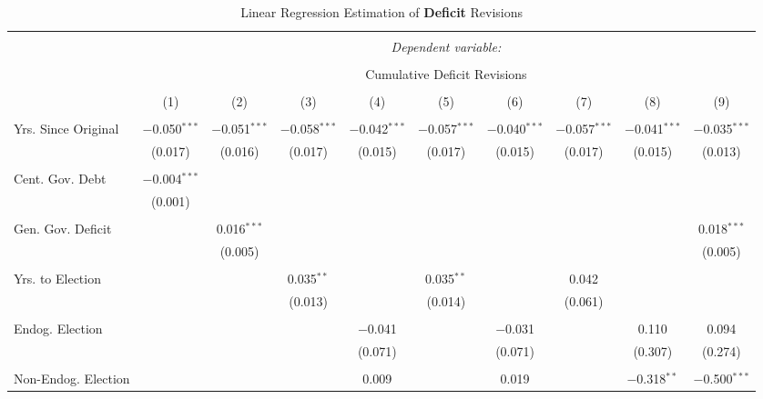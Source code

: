 
\begin{table}[!htbp] \centering 
  \caption{Linear Regression Estimation of \textbf{Deficit} Revisions} 
  \label{deficit_results} 
\tiny 
\begin{tabular}{@{\extracolsep{5pt}}lccccccccc} 
\\[-1.8ex]\hline 
\hline \\[-1.8ex] 
 & \multicolumn{9}{c}{\textit{Dependent variable:}} \\ 
\cline{2-10} 
\\[-1.8ex] & \multicolumn{9}{c}{Cumulative Deficit Revisions} \\ 
\\[-1.8ex] & (1) & (2) & (3) & (4) & (5) & (6) & (7) & (8) & (9)\\ 
\hline \\[-1.8ex] 
 Yrs. Since Original & $-$0.050$^{***}$ & $-$0.051$^{***}$ & $-$0.058$^{***}$ & $-$0.042$^{***}$ & $-$0.057$^{***}$ & $-$0.040$^{***}$ & $-$0.057$^{***}$ & $-$0.041$^{***}$ & $-$0.035$^{***}$ \\ 
  & (0.017) & (0.016) & (0.017) & (0.015) & (0.017) & (0.015) & (0.017) & (0.015) & (0.013) \\ 
  & & & & & & & & & \\ 
 Cent. Gov. Debt & $-$0.004$^{***}$ &  &  &  &  &  &  &  &  \\ 
  & (0.001) &  &  &  &  &  &  &  &  \\ 
  & & & & & & & & & \\ 
 Gen. Gov. Deficit &  & 0.016$^{***}$ &  &  &  &  &  &  & 0.018$^{***}$ \\ 
  &  & (0.005) &  &  &  &  &  &  & (0.005) \\ 
  & & & & & & & & & \\ 
 Yrs. to Election &  &  & 0.035$^{**}$ &  & 0.035$^{**}$ &  & 0.042 &  &  \\ 
  &  &  & (0.013) &  & (0.014) &  & (0.061) &  &  \\ 
  & & & & & & & & & \\ 
 Endog. Election &  &  &  & $-$0.041 &  & $-$0.031 &  & 0.110 & 0.094 \\ 
  &  &  &  & (0.071) &  & (0.071) &  & (0.307) & (0.274) \\ 
  & & & & & & & & & \\ 
 Non-Endog. Election &  &  &  & 0.009 &  & 0.019 &  & $-$0.318$^{**}$ & $-$0.500$^{***}$ \\ 

\end{tabular}
\end{table}
